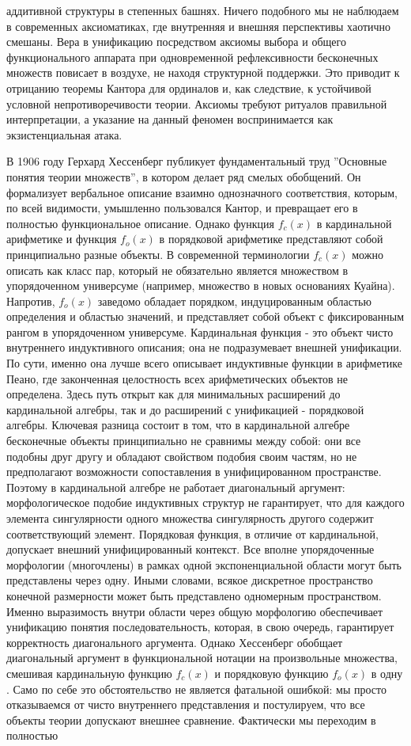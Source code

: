 \documentclass[12pt]{article}
\begin{document}
аддитивной структуры в степенных башнях. Ничего подобного мы не наблюдаем в современных аксиоматиках, где внутренняя и внешняя перспективы хаотично смешаны. Вера в унификацию посредством аксиомы выбора и общего функционального аппарата при одновременной рефлексивности бесконечных множеств повисает в воздухе, не находя структурной поддержки. Это приводит к отрицанию теоремы Кантора для ординалов и, как следствие, к устойчивой условной непротиворечивости теории. Аксиомы требуют ритуалов правильной интерпретации, а указание на данный феномен воспринимается как экзистенциальная атака. 

В 1906 году Герхард Хессенберг публикует фундаментальный труд ''Основные понятия теории множеств'', в котором делает ряд смелых обобщений. Он формализует вербальное описание взаимно однозначного соответствия, которым, по всей видимости, умышленно пользовался Кантор, и превращает его в полностью функциональное описание. Однако функция $f_c(x)$ в кардинальной арифметике и функция $f_o(x)$ в порядковой арифметике представляют собой принципиально разные объекты. В современной терминологии $f_c(x)$ можно описать как класс пар, который не обязательно является множеством в упорядоченном универсуме (например, множество в новых основаниях Куайна). Напротив, $f_o(x)$ заведомо обладает порядком, индуцированным областью определения и областью значений, и представляет собой объект с фиксированным рангом в упорядоченном универсуме. Кардинальная функция - это объект чисто внутреннего индуктивного описания; она не подразумевает внешней унификации. По сути, именно она лучше всего описывает индуктивные функции в арифметике Пеано, где законченная целостность всех арифметических объектов не определена. Здесь путь открыт как для минимальных расширений до кардинальной алгебры, так и до расширений с унификацией - порядковой алгебры. Ключевая разница состоит в том, что в кардинальной алгебре бесконечные объекты принципиально не сравнимы между собой: они все подобны друг другу и обладают свойством подобия своим частям, но не предполагают возможности сопоставления в унифицированном пространстве. Поэтому в кардинальной алгебре не работает диагональный аргумент: морфологическое подобие индуктивных структур не гарантирует, что для каждого элемента сингулярности одного множества сингулярность другого содержит соответствующий элемент. Порядковая функция, в отличие от кардинальной, допускает внешний унифицированный контекст. Все вполне упорядоченные морфологии (многочлены) в рамках одной экспоненциальной области могут быть представлены через одну. Иными словами, всякое дискретное пространство конечной размерности может быть представлено одномерным пространством. Именно выразимость внутри области через общую морфологию обеспечивает унификацию понятия последовательность, которая, в свою очередь, гарантирует корректность диагонального аргумента. Однако Хессенберг обобщает диагональный аргумент в функциональной нотации на произвольные множества, смешивая кардинальную функцию $f_c(x)$ и порядковую функцию $f_o(x)$ в одну \cite{hessenberg}. Само по себе это обстоятельство не является фатальной ошибкой: мы просто отказываемся от чисто внутреннего представления и постулируем, что все объекты теории допускают внешнее сравнение. Фактически мы переходим в полностью 
\end{document}
